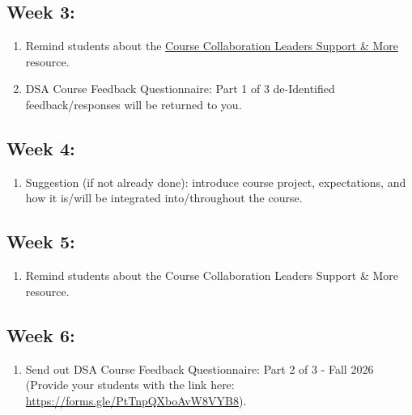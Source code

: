 \documentclass[
  letterpaper,
  DIV=11,
  numbers=noendperiod]{scrreprt}
\providecommand{\tightlist}{%
  \setlength{\itemsep}{0pt}\setlength{\parskip}{0pt}}
\begin{document}
\subsection{Week 3:}\label{week-3}

\begin{enumerate}
\def\labelenumi{\arabic{enumi})}
\item
  Remind students about the
  \href{https://datascienceacademy.ncsu.edu/courses/course-collaboration-leaders/}{Course
  Collaboration Leaders Support \& More} resource.
\item
  DSA Course Feedback Questionnaire: Part 1 of 3 de-Identified
  feedback/responses will be returned to you.
\end{enumerate}

\subsection{Week 4:}\label{week-4}

\begin{enumerate}
\def\labelenumi{\arabic{enumi})}
\tightlist
\item
  Suggestion (if not already done): introduce course project,
  expectations, and how it is/will be integrated into/throughout the
  course.
\end{enumerate}

\subsection{Week 5:}\label{week-5}

\begin{enumerate}
\def\labelenumi{\arabic{enumi})}
\tightlist
\item
  Remind students about the Course Collaboration Leaders Support \& More
  resource.
\end{enumerate}

\subsection{Week 6:}\label{week-6}

\begin{enumerate}
\def\labelenumi{\arabic{enumi})}
\tightlist
\item
  Send out {DSA Course Feedback Questionnaire: Part 2 of 3 - Fall 2026}
  (Provide your students with the link here:
  \url{https://forms.gle/PtTnpQXboAvW8VYB8}).
\end{enumerate}
\end{document}
